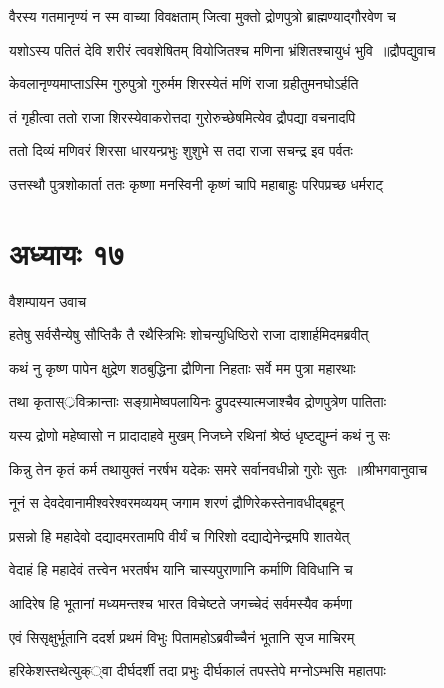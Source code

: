 \twolineshloka
{वैरस्य गतमानृण्यं न स्म वाच्या विवक्षताम्}
{जित्वा मुक्तो द्रोणपुत्रो ब्राह्मण्याद्गौरवेण च}


\threelineshloka
{यशोऽस्य पतितं देवि शरीरं त्ववशेषितम्}
{वियोजितश्च मणिना भ्रंशितश्चायुधं भुवि ॥द्रौपद्युवाच}
{}


\twolineshloka
{केवलानृण्यमाप्ताऽस्मि गुरुपुत्रो गुरुर्मम}
{शिरस्येतं मणिं राजा ग्रहीतुमनघोऽर्हति}


\twolineshloka
{तं गृहीत्वा ततो राजा शिरस्येवाकरोत्तदा}
{गुरोरुच्छेषमित्येव द्रौपद्या वचनादपि}


\twolineshloka
{ततो दिव्यं मणिवरं शिरसा धारयन्प्रभुः}
{शुशुभे स तदा राजा सचन्द्र इव पर्वतः}


\twolineshloka
{उत्तस्थौ पुत्रशोकार्ता ततः कृष्णा मनस्विनी}
{कृष्णं चापि महाबाहुः परिपप्रच्छ धर्मराट्}


\chapter{अध्यायः १७}
\twolineshloka
{वैशम्पायन उवाच}
{}


\twolineshloka
{हतेषु सर्वसैन्येषु सौप्तिकै तै रथैस्त्रिभिः}
{शोचन्युधिष्ठिरो राजा दाशार्हमिदमब्रवीत्}


\twolineshloka
{कथं नु कृष्ण पापेन क्षुद्रेण शठबुद्धिना}
{द्रौणिना निहताः सर्वे मम पुत्रा महारथाः}


\twolineshloka
{तथा कृतास््रविक्रान्ताः सङ्ग्रामेष्वपलायिनः}
{द्रुपदस्यात्मजाश्चैव द्रोणपुत्रेण पातिताः}


\twolineshloka
{यस्य द्रोणो महेष्वासो न प्रादादाहवे मुखम्}
{निजघ्ने रथिनां श्रेष्ठं धृष्टद्युम्नं कथं नु सः}


\threelineshloka
{किन्नु तेन कृतं कर्म तथायुक्तं नरर्षभ}
{यदेकः समरे सर्वानवधीन्नो गुरोः सुतः ॥श्रीभगवानुवाच}
{}


\twolineshloka
{नूनं स देवदेवानामीश्वरेश्वरमव्ययम्}
{जगाम शरणं द्रौणिरेकस्तेनावधीद्बहून्}


\twolineshloka
{प्रसन्नो हि महादेवो दद्यादमरतामपि}
{वीर्यं च गिरिशो दद्याद्येनेन्द्रमपि शातयेत्}


\twolineshloka
{वेदाहं हि महादेवं तत्त्वेन भरतर्षभ}
{यानि चास्यपुराणानि कर्माणि विविधानि च}


\twolineshloka
{आदिरेष हि भूतानां मध्यमन्तश्च भारत}
{विचेष्टते जगच्चेदं सर्वमस्यैव कर्मणा}


\twolineshloka
{एवं सिसृक्षुर्भूतानि ददर्श प्रथमं विभुः}
{पितामहोऽब्रवीच्चैनं भूतानि सृज माचिरम्}


\twolineshloka
{हरिकेशस्तथेत्युक््वा दीर्घदर्शी तदा प्रभुः}
{दीर्घकालं तपस्तेपे मग्नोऽम्भसि महातपाः}


